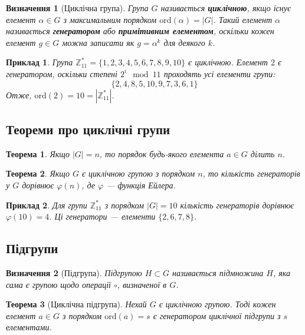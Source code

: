 \documentclass[12pt]{report}
\newtheorem{definition}{Визначення}[chapter]
\newtheorem{theorem}{Теорема}[chapter]
\newtheorem{example}{Приклад}[chapter]
\begin{document}
\begin{definition}[Циклічна група]
Група \( G \) називається \textbf{циклічною}, якщо існує елемент \( \alpha \in G \) з максимальним порядком \( \text{ord}(\alpha) = |G| \). Такий елемент \( \alpha \) називається \textbf{генератором} або \textbf{примітивним елементом}, оскільки кожен елемент \( g \in G \) можна записати як \( g = \alpha^k \) для деякого \( k \).
\end{definition}

\begin{example}
Група \( \mathbb{Z}^*_{11} = \{1, 2, 3, 4, 5, 6, 7, 8, 9, 10\} \) є циклічною. Елемент \( 2 \) є генератором, оскільки степені \( 2^i \mod 11 \) проходять усі елементи групи:
\[
\{2, 4, 8, 5, 10, 9, 7, 3, 6, 1\}
\]
Отже, \( \text{ord}(2) = 10 = |\mathbb{Z}^*_{11}| \).
\end{example}

\subsection{Теореми про циклічні групи}

\begin{theorem}
Якщо \( |G| = n \), то порядок будь-якого елемента \( a \in G \) ділить \( n \).
\end{theorem}

\begin{theorem}
Якщо \( G \) є циклічною групою з порядком \( n \), то кількість генераторів у \( G \) дорівнює \( \varphi(n) \), де \( \varphi \) — функція Ейлера.
\end{theorem}

\begin{example}
Для групи \( \mathbb{Z}^*_{11} \) з порядком \( |G| = 10 \) кількість генераторів дорівнює \( \varphi(10) = 4 \). Ці генератори — елементи \( \{2, 6, 7, 8\} \).
\end{example}

\subsection{Підгрупи}

\begin{definition}[Підгрупа]
Підгрупою \( H \subset G \) називається підмножина \( H \), яка сама є групою щодо операції \( \circ \), визначеної в \( G \).
\end{definition}

\begin{theorem}[Циклічна підгрупа]
Нехай \( G \) є циклічною групою. Тоді кожен елемент \( a \in G \) з порядком \( \text{ord}(a) = s \) є генератором циклічної підгрупи з \( s \) елементами.
\end{theorem}
\end{document}
